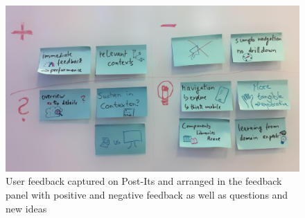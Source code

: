 \begin{figure}
\begin{centering}
    \includegraphics[width=1.0\linewidth]{images/user_feedback}
    \caption{User feedback captured on Post-Its and arranged in the feedback panel with positive and negative feedback as well as questions and new ideas}
    \label{fig:user_feedback}
\end{centering}
\end{figure}